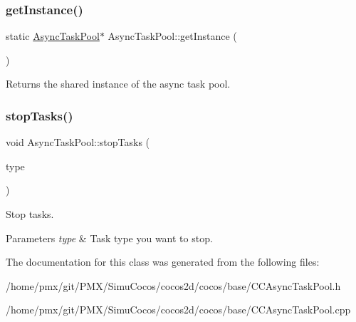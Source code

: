 \subsubsection{\texorpdfstring{get\+Instance()}{getInstance()}\hspace{0.1cm}{\footnotesize\ttfamily [2/2]}}
{\footnotesize\ttfamily static \hyperlink{classAsyncTaskPool}{Async\+Task\+Pool}$\ast$ Async\+Task\+Pool\+::get\+Instance (\begin{DoxyParamCaption}{ }\end{DoxyParamCaption})\hspace{0.3cm}{\ttfamily [static]}}

Returns the shared instance of the async task pool. \mbox{\label{classAsyncTaskPool_acb1c072daf35d81ddc62e1f40b61da29}} 
\subsubsection{\texorpdfstring{stop\+Tasks()}{stopTasks()}}
{\footnotesize\ttfamily void Async\+Task\+Pool\+::stop\+Tasks (\begin{DoxyParamCaption}\item[{Task\+Type}]{type }\end{DoxyParamCaption})}

Stop tasks.


\begin{DoxyParams}{Parameters}
{\em type} & Task type you want to stop. \\
\hline
\end{DoxyParams}


The documentation for this class was generated from the following files\+:\begin{DoxyCompactItemize}
\item 
/home/pmx/git/\+P\+M\+X/\+Simu\+Cocos/cocos2d/cocos/base/C\+C\+Async\+Task\+Pool.\+h\item 
/home/pmx/git/\+P\+M\+X/\+Simu\+Cocos/cocos2d/cocos/base/C\+C\+Async\+Task\+Pool.\+cpp\end{DoxyCompactItemize}

